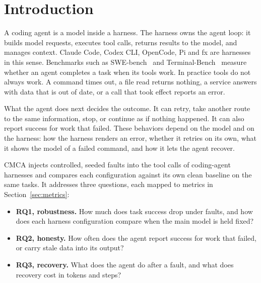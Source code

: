 \section{Introduction}
\label{sec:intro}

A coding agent is a model inside a harness.
The harness owns the agent loop: it builds model requests, executes tool calls, returns results to the model, and manages context.
Claude Code, Codex CLI, OpenCode, Pi and fx are harnesses in this sense.
Benchmarks such as SWE-bench~\citep{jimenez2024swebench} and Terminal-Bench~\citep{merrill2026terminalbench} measure whether an agent completes a task when its tools work.
In practice tools do not always work.
A command times out, a file read returns nothing, a service answers with data that is out of date, or a call that took effect reports an error.

What the agent does next decides the outcome.
It can retry, take another route to the same information, stop, or continue as if nothing happened.
It can also report success for work that failed.
These behaviors depend on the model and on the harness: how the harness renders an error, whether it retries on its own, what it shows the model of a failed command, and how it lets the agent recover.

CMCA injects controlled, seeded faults into the tool calls of coding-agent harnesses and compares each configuration against its own clean baseline on the same tasks.
It addresses three questions, each mapped to metrics in Section~\ref{sec:metrics}:
\begin{itemize}
\item \textbf{RQ1, robustness.} How much does task success drop under faults, and how does each harness configuration compare when the main model is held fixed?
\item \textbf{RQ2, honesty.} How often does the agent report success for work that failed, or carry stale data into its output?
\item \textbf{RQ3, recovery.} What does the agent do after a fault, and what does recovery cost in tokens and steps?
\end{itemize}


